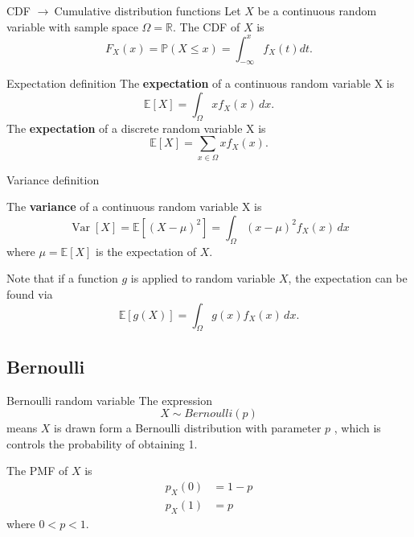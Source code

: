 \documentclass[11pt,a4paper,fleqn]{article}
\numberwithin{equation}{section}
\newcommand{\samplespace}{\Omega}
\newcommand{\g}{$\rightarrow\ $}
\DeclareMathOperator\Var{\mathrm{Var}}
\begin{document}
\begin{fact}{CDF \g Cumulative distribution functions}{}
    Let $X$ be a continuous random variable with sample space $\samplespace=\mathbb{R}$.
    The CDF of $X$ is
    \begin{equation*}
        F_X(x)=\mathbb{P}(X\le x)=\int_{-\infty}^{x}f_X(t)dt.
    \end{equation*}
\end{fact}

\begin{fact}{Expectation definition}{}
    The \textbf{expectation} of a continuous random variable X is
    \begin{equation*}
        \mathbb{E}[X] = \int_{\samplespace}xf_X(x)\,dx.
    \end{equation*}
    The \textbf{expectation} of a discrete random variable X is
    \begin{equation*}
        \mathbb{E}[X]=\sum_{x\in \samplespace}x f_X(x).
    \end{equation*}
\end{fact}

\begin{fact}{Variance definition}{}

    The \textbf{variance} of a continuous random variable X is
    \begin{equation*}
        \Var[X] = \mathbb{E}[(X-\mu)^2]=\int_{\samplespace}(x-\mu)^2f_X(x)\,dx
    \end{equation*}
    where $\mu=\mathbb{E}[X]$ is the expectation of $X$.
\end{fact}

Note that if a function $g$ is applied to random variable $X$, the expectation can be found via
\begin{equation*}
    \mathbb{E}[g(X)]=\int_{\samplespace}g(x)f_X(x)\,dx.
\end{equation*}

\subsection{Bernoulli}

\begin{fact}{Bernoulli random variable}{}
    The expression
    \begin{equation*}
        X \sim Bernoulli(p)
    \end{equation*}
    means $X$ is drawn form a Bernoulli distribution with parameter $p$
    , which is controls the probability of obtaining 1.

    The PMF of $X$ is
    \begin{align*}
        p_X(0) &= 1-p\\
        p_X(1) &= p
    \end{align*}
    where $0<p<1$.
\end{fact}
\end{document}
